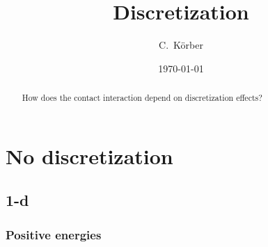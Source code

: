 \documentclass[aps, prl, showkeys, nofootinbib, twocolumn, floatfix]{revtex4-1}
\begin{document}
\title{Discretization}

\author{C.~Körber}

\date{\today}

\begin{abstract}%
	How does the contact interaction depend on discretization effects?
\end{abstract}

\maketitle

\section{No discretization}
\subsection{1-d}
\subsubsection{Positive energies}
\end{document}
